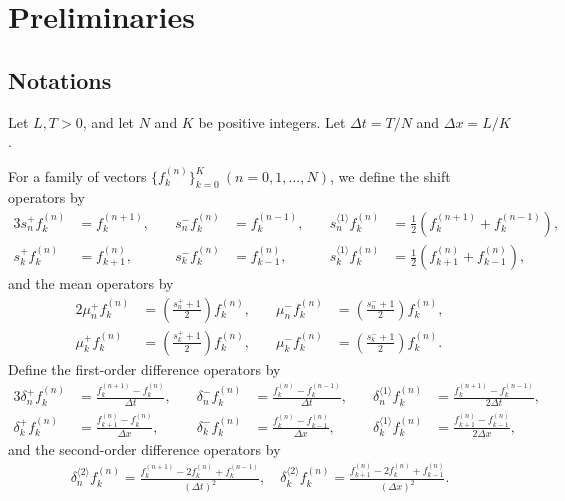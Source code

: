 \documentclass[dvipdfmx-if-dvi,autodetect-engine,ja=standard]{amsart}
\numberwithin{equation}{section} %
\begin{document}
\section{Preliminaries}
\subsection{Notations}
Let
$L, T > 0$,
and let
$N$ and $K$ be positive integers.
Let
$\Delta t = T/N$
and
$\Delta x = L/K$.

For a family of vectors
$\{ f_k^{(n)} \}_{k=0}^K \ (n=0,1,\ldots,N)$,
we define the shift operators by
\begin{alignat}{3}
    s_n^+ f_k^{(n)}
    &= f_k^{(n+1)},
    &\quad
    s_n^- f_k^{(n)}
    &= f_k^{(n-1)},
    &\quad
    s_n^{\langle 1 \rangle} f_k^{(n)}
    &= \frac{1}{2}\left( f_k^{(n+1)}+f_k^{(n-1)}\right),\\
    s_k^+ f_k^{(n)}
    &= f_{k+1}^{(n)},
    &\quad
    s_k^- f_k^{(n)}
    &= f_{k-1}^{(n)},
    &\quad
    s_k^{\langle 1 \rangle} f_k^{(n)}
    &= \frac{1}{2}\left( f_{k+1}^{(n)} + f_{k-1}^{(n)} \right),
\end{alignat}
and the mean operators by
\begin{alignat}{2}
    \mu_n^+ f_k^{(n)}
    &= \left( \frac{s_n^+ + 1}{2} \right) f_k^{(n)},
    &\quad
    \mu_n^- f_k^{(n)}
    &=\left( \frac{s_n^- + 1}{2} \right) f_k^{(n)} ,\\
    \mu_k^+ f_k^{(n)}
    &= \left( \frac{s_k^+ + 1}{2} \right) f_k^{(n)},
    &\quad
    \mu_k^- f_k^{(n)}
    &= \left( \frac{s_k^- + 1}{2} \right) f_k^{(n)}.
\end{alignat}
Define the first-order difference operators by
\begin{alignat}{3}
    \delta_n^+ f_{k}^{(n)} &= \frac{f_k^{(n+1)}-f_k^{(n)}}{\Delta t},
    &\quad \delta_n^- f_{k}^{(n)} &= \frac{f_k^{(n)}-f_k^{(n-1)}}{\Delta t},
    &\quad \delta_n^{\langle 1\rangle} f_k^{(n)} &=
    \frac{f_k^{(n+1)}-f_k^{(n-1)}}{2\Delta t},\\
    \delta_k^+ f_{k}^{(n)} &= \frac{f_{k+1}^{(n)}-f_k^{(n)}}{\Delta x},
    &\quad \delta_k^- f_{k}^{(n)} &= \frac{f_k^{(n)}-f_{k-1}^{(n)}}{\Delta x},
    &\quad \delta_k^{\langle 1\rangle} f_k^{(n)} &=
    \frac{f_{k+1}^{(n)}-f_{k-1}^{(n)}}{2\Delta x},
\end{alignat}
and the second-order difference operators by
\begin{align}
    \delta_n^{\langle 2 \rangle} f_k^{(n)}
    = \frac{f_{k}^{(n+1)}-2f_k^{(n)}+f_k^{(n-1)}}{(\Delta t)^2},\quad
    \delta_k^{\langle 2 \rangle} f_k^{(n)}
    = \frac{f_{k+1}^{(n)} - 2 f_k^{(n)} + f_{k-1}^{(n)}}{(\Delta x)^2}.
\end{align}
\end{document}
